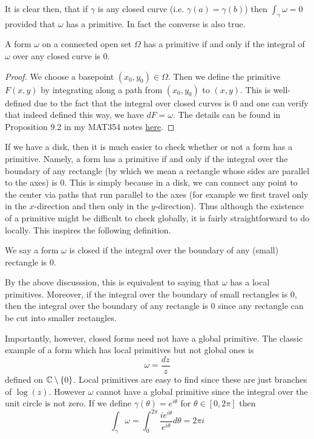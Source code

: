 It is clear then, that if $\gamma$ is any closed curve (i.e. $\gamma(a) = \gamma(b)$) then $\int_\gamma \omega = 0$ provided that $\omega$ has a primitive. In fact the converse is also true.
\begin{theorem}
A form $\omega$ on a connected open set $\Omega$ has a primitive if and only if the integral of $\omega$ over any closed curve is 0.
\end{theorem}
\begin{proof}
We choose a basepoint $(x_0, y_0) \in \Omega$. Then we define the primitive $F(x, y)$ by integrating along a path from $(x_0, y_0)$ to $(x, y)$. This is well-defined due to the fact that the integral over closed curves is 0 and one can verify that indeed defined this way, we have $dF = \omega$. The details can be found in Proposition 9.2 in my MAT354 notes \href{http://individual.utoronto.ca/rishibhp/notes/MAT354_notes.pdf}{here}. 
\end{proof}

If we have a disk, then it is much easier to check whether or not a form has a primitive. Namely, a form has a primitive if and only if the integral over the boundary of any rectangle (by which we mean a rectangle whose sides are parallel to the axes) is 0. This is simply because in a disk, we can connect any point to the center via paths that run parallel to the axes (for example we first travel only in the $x$-direction and then only in the $y$-direction). Thus although the existence of a primitive might be difficult to check globally, it is fairly straightforward to do locally. This inspires the following definition.

\begin{definition}
    We say a form $\omega$ is closed if the integral over the boundary of any (small) rectangle is 0.
\end{definition}
By the above discusssion, this is equivalent to saying that $\omega$ has a local primitives. Moreover, if the integral over the boundary of small rectangles is 0, then the integral over the boundary of any rectangle is 0 since any rectangle can be cut into smaller rectangles.

Importantly, however, closed forms need not have a global primitive. The classic example of a form which has local primitives but not global ones is 
$$ \omega = \frac{dz}{z}$$
defined on $\mathbb{C} \setminus \{0\}$. Local primitives are easy to find since these are just branches of $\log(z)$. However $\omega$ cannot have a global primitive since the integral over the unit circle is not zero. If we define $\gamma(\theta) = e^{i \theta}$ for $\theta \in [0, 2\pi]$ then
$$\int_\gamma \omega = \int_0^{2\pi} \frac{i e^{i\theta}}{e^{i \theta}} d\theta = 2\pi i$$


